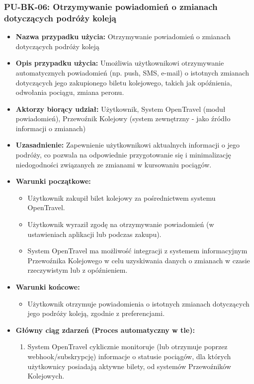 \documentclass[a4paper,12pt]{article}
\begin{document}
\subsubsection{PU-BK-06: Otrzymywanie powiadomień o zmianach dotyczących podróży koleją}
\begin{itemize}
\item \textbf{Nazwa przypadku użycia:} Otrzymywanie powiadomień o zmianach dotyczących podróży koleją
\item \textbf{Opis przypadku użycia:} Umożliwia użytkownikowi otrzymywanie automatycznych powiadomień (np. push, SMS, e-mail) o istotnych zmianach dotyczących jego zakupionego biletu kolejowego, takich jak opóźnienia, odwołania pociągu, zmiana peronu.
\item \textbf{Aktorzy biorący udział:} Użytkownik, System OpenTravel (moduł powiadomień), Przewoźnik Kolejowy (system zewnętrzny - jako źródło informacji o zmianach)
\item \textbf{Uzasadnienie:} Zapewnienie użytkownikowi aktualnych informacji o jego podróży, co pozwala na odpowiednie przygotowanie się i minimalizację niedogodności związanych ze zmianami w kursowaniu pociągów.
\item \textbf{Warunki początkowe:}
\begin{itemize}
\item Użytkownik zakupił bilet kolejowy za pośrednictwem systemu OpenTravel.
\item Użytkownik wyraził zgodę na otrzymywanie powiadomień (w ustawieniach aplikacji lub podczas zakupu).
\item System OpenTravel ma możliwość integracji z systemem informacyjnym Przewoźnika Kolejowego w celu uzyskiwania danych o zmianach w czasie rzeczywistym lub z opóźnieniem.
\end{itemize}
\item \textbf{Warunki końcowe:}
\begin{itemize}
\item Użytkownik otrzymuje powiadomienia o istotnych zmianach dotyczących jego podróży koleją, zgodnie z preferencjami.
\end{itemize}
\item \textbf{Główny ciąg zdarzeń (Proces automatyczny w tle):}
\begin{enumerate}
\item System OpenTravel cyklicznie monitoruje (lub otrzymuje poprzez webhook/subskrypcję) informacje o statusie pociągów, dla których użytkownicy posiadają aktywne bilety, od systemów Przewoźników Kolejowych.

\end{enumerate}
\end{itemize}
\end{document}
